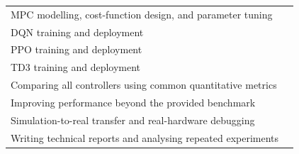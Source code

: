 \documentclass[11pt,a4paper]{article}
\begin{document}
{\begin{table}[H]
\begin{tabularx}{\linewidth}{Y C}
MPC modelling, cost-function design, and parameter tuning
& \\

DQN training and deployment
& \\

PPO training and deployment
& \\

TD3 training and deployment
& \\

Comparing all controllers using common quantitative metrics
& \\

Improving performance beyond the provided benchmark
& \\

Simulation-to-real transfer and real-hardware debugging
& \\

Writing technical reports and analysing repeated experiments
& \\
\bottomrule
\end{tabularx}
\end{table}


} %




\end{document}
